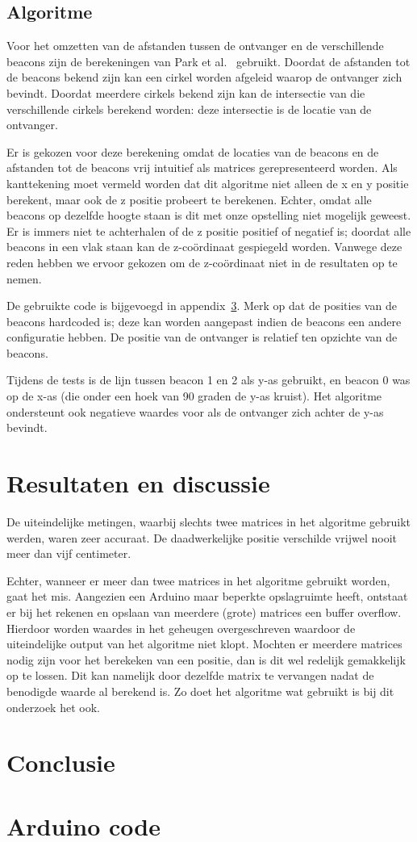 \documentclass[a4paper,10pt]{article}
\begin{document}
\subsection{Algoritme}
Voor het omzetten van de afstanden tussen de ontvanger en de verschillende beacons zijn de berekeningen van Park et al.~\cite{park2011beacon} gebruikt. Doordat de afstanden tot de beacons bekend zijn kan een cirkel worden afgeleid waarop de ontvanger zich bevindt. Doordat meerdere cirkels bekend zijn kan de intersectie van die verschillende cirkels berekend worden: deze intersectie is de locatie van de ontvanger.

Er is gekozen voor deze berekening omdat de locaties van de beacons en de afstanden tot de beacons vrij intuitief als matrices gerepresenteerd worden. Als kanttekening moet vermeld worden dat dit algoritme niet alleen de x en y positie berekent, maar ook de z positie probeert te berekenen. Echter, omdat alle beacons op dezelfde hoogte staan is dit met onze opstelling niet mogelijk geweest. Er is immers niet te achterhalen of de z positie positief of negatief is; doordat alle beacons in een vlak staan kan de z-co\"ordinaat gespiegeld worden. Vanwege deze reden hebben we ervoor gekozen om de z-co\"ordinaat niet in de resultaten op te nemen.

De gebruikte code is bijgevoegd in appendix~\ref{sec:code}. Merk op dat de posities van de beacons hardcoded is; deze kan worden aangepast indien de beacons een andere configuratie hebben. De positie van de ontvanger is relatief ten opzichte van de beacons.

Tijdens de tests is de lijn tussen beacon 1 en 2 als y-as gebruikt, en beacon 0 was op de x-as (die onder een hoek van 90 graden de y-as kruist). Het algoritme ondersteunt ook negatieve waardes voor als de ontvanger zich achter de y-as bevindt.

\section{Resultaten en discussie}\label{sec:resultaten}
De uiteindelijke metingen, waarbij slechts twee matrices in het algoritme gebruikt werden, waren zeer accuraat. De daadwerkelijke positie verschilde vrijwel nooit meer dan vijf centimeter. 

Echter, wanneer er meer dan twee matrices in het algoritme gebruikt worden, gaat het mis. Aangezien een Arduino maar beperkte opslagruimte heeft, ontstaat er bij het rekenen en opslaan van meerdere (grote) matrices een buffer overflow. Hierdoor worden waardes in het geheugen overgeschreven waardoor de uiteindelijke output van het algoritme niet klopt. Mochten er meerdere matrices nodig zijn voor het berekeken van een positie, dan is dit wel redelijk gemakkelijk op te lossen. Dit kan namelijk door dezelfde matrix te vervangen nadat de benodigde waarde al berekend is. Zo doet het algoritme wat gebruikt is bij dit onderzoek het ook.

\section{Conclusie}\label{sec:conclusie}




\newpage
\appendix
\section{Arduino code}
\label{sec:code}

\end{document}
